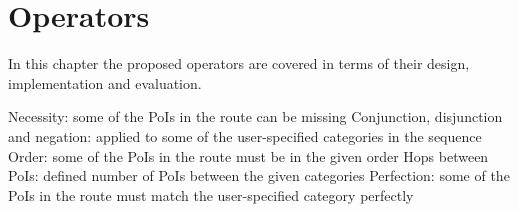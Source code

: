 \chapter{Operators} 
\label{sec:operators}

In this chapter the proposed operators are covered in terms of their design, implementation and evaluation.\newline

\noindent Necessity: some of the PoIs in the route can be missing\newline
Conjunction, disjunction and negation: applied to some of the user-specified categories in the sequence\newline
Order: some of the PoIs in the route must be in the given order\newline
Hops between PoIs: defined number of PoIs between the given categories\newline
Perfection:  some of the PoIs in the route must match the user-specified category perfectly\newline

